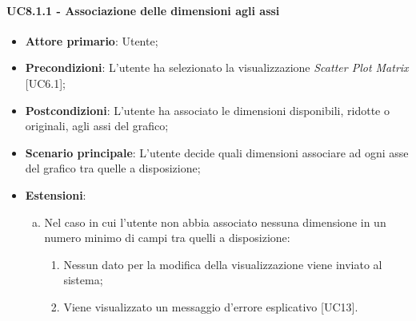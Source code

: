\paragraph{UC8.1.1 - Associazione delle dimensioni agli assi}
\begin{itemize}
	\item \textbf{Attore primario}: Utente;
	\item \textbf{Precondizioni}: L'utente ha selezionato la visualizzazione \textit{Scatter Plot Matrix} [UC6.1];
	\item \textbf{Postcondizioni}: L'utente ha associato le dimensioni disponibili, ridotte o originali, agli assi del grafico;
	
	\item \textbf{Scenario principale}: L'utente decide quali dimensioni associare ad ogni asse del grafico tra quelle a disposizione;
	
		\item \textbf{Estensioni}:
	\begin{enumerate}[(a)]
		\item Nel caso in cui l'utente non abbia associato nessuna dimensione in un numero minimo di campi tra quelli a disposizione:
		\begin{enumerate}[1.]
			\item Nessun dato per la modifica della visualizzazione viene inviato al sistema;
			\item Viene visualizzato un messaggio d'errore esplicativo [UC13].
		\end{enumerate}
	\end{enumerate}
\end{itemize}